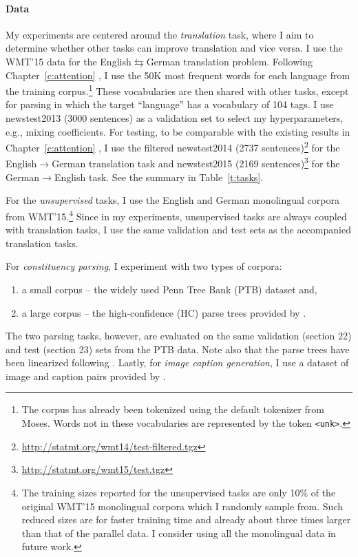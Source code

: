 \paragraph{Data}
My experiments are centered around the {\it translation} task, where I aim to determine 
whether other tasks can improve translation and vice versa. I use the WMT'15 data
\citep{bojar15} for the English$\leftrightarrows$German
translation problem. Following 
Chapter~\ref{c:attention} \cite{luong15attn}, I use the 50K most frequent words for each
language from the training corpus.\footnote{The corpus has already been tokenized using the default
tokenizer from Moses.  Words not in these vocabularies are represented by the token
\texttt{<unk>}.} These vocabularies are then shared with other tasks, except for
parsing in which the target ``language'' has a vocabulary of 104 tags. 
I use newstest2013 (3000 sentences) as a validation set to select my
hyperparameters, e.g., mixing coefficients. For testing, to be comparable with the existing results
in Chapter~\ref{c:attention} \cite{luong15attn}, I use the filtered
newstest2014 (2737
sentences)\footnote{\url{http://statmt.org/wmt14/test-filtered.tgz}} for the
English$\rightarrow$German translation task and newstest2015 (2169
sentences)\footnote{\url{http://statmt.org/wmt15/test.tgz}}
for the German$\rightarrow$English task.
See the summary in Table~\ref{t:tasks}.

For the {\it unsupervised} tasks, I use the English and German monolingual corpora
from WMT'15.\footnote{The training sizes reported for
the unsupervised tasks are
only 10\% of
the original WMT'15 monolingual corpora which I randomly sample from. Such reduced sizes are
for faster training time and already about three times larger than that of the parallel
data. I consider using all the monolingual data in future work.} Since in
my experiments, unsupervised tasks are always coupled with translation tasks,
I use the same validation and test sets as the accompanied translation tasks.

For {\it constituency parsing}, I experiment with two types of corpora:
\begin{enumerate}
\item a small corpus -- the widely used
Penn Tree Bank (PTB) dataset \citep{Marcus:1993:BLA} and,
\item a large corpus -- the high-confidence (HC) parse trees 
provided by \citet{vinyals15grammar}.
\end{enumerate}
The two parsing tasks, however, are evaluated on the same validation (section
22) and test (section 23)
sets from the PTB data. Note also that the parse trees have been linearized
following \citet{vinyals15grammar}. 
Lastly, for {\it image caption generation}, I use a dataset of image and caption pairs provided by
\citet{vinyals15caption}.

